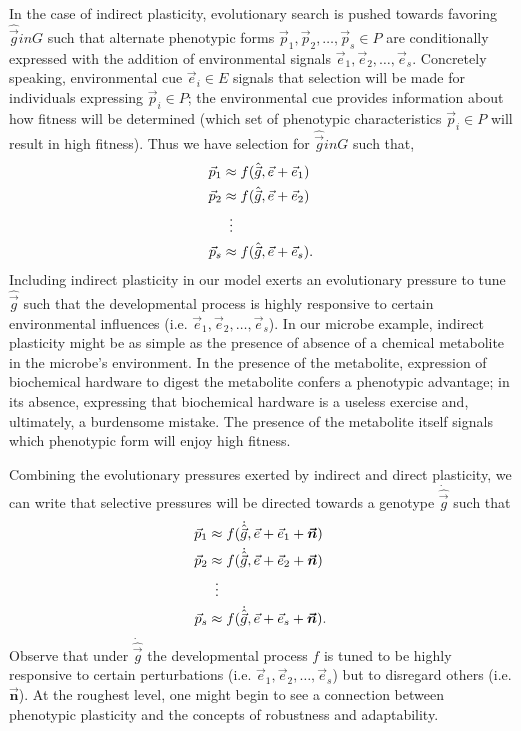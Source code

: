 In the case of indirect plasticity, evolutionary search is pushed towards favoring $\hat{\vec{g}} in G$ such that alternate phenotypic forms $\vec{p}_1, \vec{p}_2, \hdots, \vec{p}_s \in P$ are conditionally expressed with the addition of environmental signals $\vec{e}_1, \vec{e}_2, \hdots, \vec{e}_s$. Concretely speaking, environmental cue $\vec{e}_i \in E$ signals that selection will be made for individuals expressing $\vec{p}_i \in P$; the environmental cue provides information about how fitness will be determined (which set of phenotypic characteristics $\vec{p}_i \in P$ will result in high fitness). Thus we have selection for $\hat{\vec{g}} in G$ such that,
\begin{align*}
\vec{p}_1 &\approx f(\hat{\vec{g}}, \vec{e} + \vec{e}_1) \\
\vec{p}_2 &\approx f(\hat{\vec{g}}, \vec{e} + \vec{e}_2) \\
&\vdotswithin{\approx} \\
\vec{p}_s &\approx f(\hat{\vec{g}}, \vec{e} + \vec{e}_s).
\end{align*}
Including indirect plasticity in our model exerts an evolutionary pressure to tune $\hat{\vec{g}}$ such that the developmental process is highly responsive to certain environmental influences (i.e. $\vec{e}_1, \vec{e}_2, \hdots, \vec{e}_s$). In our microbe example, indirect plasticity might be as simple as the presence of absence of a chemical metabolite in the microbe's environment. In the presence of the metabolite, expression of biochemical hardware to digest the metabolite confers a phenotypic advantage; in its absence, expressing that biochemical hardware is a useless exercise and, ultimately, a burdensome mistake. The presence of the metabolite itself signals which phenotypic form will enjoy high fitness.

Combining the evolutionary pressures exerted by indirect and direct plasticity, we can write that selective pressures will be directed towards a genotype $\dot{\hat{\vec{g}}}$ such that
\begin{align*}
\vec{p}_1 &\approx f(\dot{\hat{\vec{g}}}, \vec{e} + \vec{e}_1 + \bm{\vec{n}}) \\
\vec{p}_2 &\approx f(\dot{\hat{\vec{g}}}, \vec{e} + \vec{e}_2 + \bm{\vec{n}}) \\
&\vdotswithin{\approx} \\
\vec{p}_s &\approx f(\dot{\hat{\vec{g}}}, \vec{e} + \vec{e}_s + \bm{\vec{n}}).
\end{align*}
Observe that under $\dot{\hat{\vec{g}}}$ the developmental process $f$ is tuned to be highly responsive to certain perturbations (i.e. $\vec{e}_1, \vec{e}_2, \hdots, \vec{e}_s$) but to disregard others (i.e. $\bm{\vec{n}}$). At the roughest level, one might begin to see a connection between phenotypic plasticity and the concepts of robustness and adaptability. 

